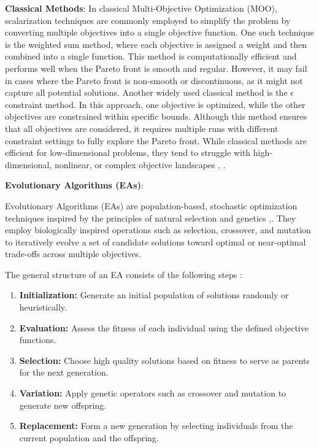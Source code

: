 \textbf{Classical Methods}: In classical Multi-Objective Optimization (MOO), scalarization techniques are commonly employed to simplify the problem by converting multiple objectives into a single objective function. One such technique is the weighted sum method, where each objective is assigned a weight and then combined into a single function. This method is computationally efficient and performs well when the Pareto front is smooth and regular. However, it may fail in cases where the Pareto front is non-smooth or discontinuous, as it might not capture all potential solutions. Another widely used classical method is the \(\epsilon\) constraint method. In this approach, one objective is optimized, while the other objectives are constrained within specific bounds. Although this method ensures that all objectives are considered, it requires multiple runs with different constraint settings to fully explore the Pareto front. While classical methods are efficient for low-dimensional problems, they tend to struggle with high-dimensional, nonlinear, or complex objective landscapes \cite{Nonlinear multiobjective optimization}, \cite{Multi-Objective Optimization using Evolutionary Algorithms}.


\textbf{Evolutionary Algorithms (EAs)}: 

Evolutionary Algorithms (EAs) are population-based, stochastic optimization techniques inspired by the principles of natural selection and genetics \citep{Evolutionary algorithms in theory and practice},\cite{Multi-Objective Optimization using Evolutionary Algorithms}. They employ biologically inspired operations such as selection, crossover, and mutation to iteratively evolve a set of candidate solutions toward optimal or near-optimal trade-offs across multiple objectives.

The general structure of an EA consists of the following steps \cite{Multi-Objective Optimization using Evolutionary Algorithms}:
\begin{enumerate}
    \item \textbf{Initialization:} Generate an initial population of solutions randomly or heuristically.
    \item \textbf{Evaluation:} Assess the fitness of each individual using the defined objective functions.
    \item \textbf{Selection:} Choose high quality solutions based on fitness to serve as parents for the next generation.
    \item \textbf{Variation:} Apply genetic operators such as crossover and mutation to generate new offspring.
    \item \textbf{Replacement:} Form a new generation by selecting individuals from the current population and the offspring.
\end{enumerate}

